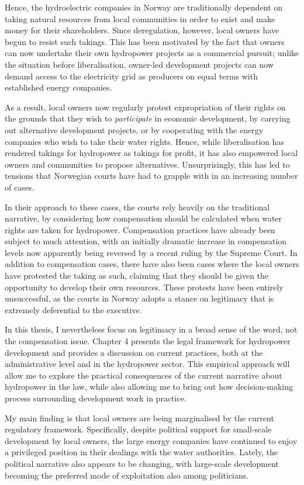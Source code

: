 Hence, the hydroelectric companies in Norway are traditionally dependent on taking natural resources from local communities in order to exist and make money for their shareholders. Since deregulation, however, local owners have begun to resist such takings. This has been motivated by the fact that owners can now undertake their own hydropower projects as a commercial pursuit; unlike the situation before liberalisation, owner-led development projects can now demand access to the electricity grid as producers on equal terms with established energy companies.

As a result, local owners now regularly protest expropriation of their rights on the grounds that they wish to {\it participate} in economic development, by carrying out alternative development projects, or by cooperating with the energy companies who wish to take their water rights. Hence, while liberalisation has rendered takings for hydropower as takings for profit, it has also empowered local owners and communities to propose alternatives. Unsurprisingly, this has led to tensions that Norwegian courts have had to grapple with in an increasing number of cases.

In their approach to these cases, the courts rely heavily on the traditional narrative, by considering how compensation should be calculated when water rights are taken for hydropower. Compensation practices have already been subject to much attention, with an initially dramatic increase in compensation levels now apparently being reversed by a recent ruling by the Supreme Court. In addition to compensation cases, there have also been cases where the local owners have protested the taking as such, claiming that they should be given the opportunity to develop their own resources. These protests have been entirely unsuccessful, as the courts in Norway adopts a stance on legitimacy that is extremely deferential to the executive.

In this thesis, I nevertheless focus on legitimacy in a broad sense of the word, not the compensation issue. Chapter 4 presents the legal framework for hydropower development and provides a discussion on  current practices, both at the administrative level and in the hydropower sector. This empirical approach will allow me to explore the practical consequences of the current narrative about hydropower in the law, while also allowing me to bring out how decision-making process surrounding development work in practice. 

My main finding is that local owners are being marginalised by the current regulatory framework. Specifically, despite political support for small-scale development by local owners, the large energy companies have continued to enjoy a privileged position in their dealings with the water authorities. Lately, the political narrative also appears to be changing, with large-scale development becoming the preferred mode of exploitation also among politicians.

